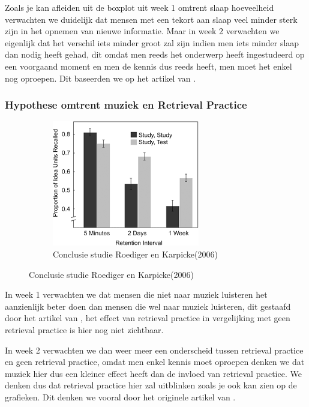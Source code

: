 \documentclass{hogent-article}
\begin{document}
Zoals je kan afleiden uit de boxplot uit week 1 omtrent slaap hoeveelheid verwachten we duidelijk dat mensen met een tekort aan slaap veel minder sterk zijn in het opnemen van nieuwe informatie. Maar in week 2 verwachten we eigenlijk dat het verschil iets minder groot zal zijn indien men iets minder slaap dan nodig heeft gehad, dit omdat men reeds het onderwerp heeft ingestudeerd op een voorgaand moment en men de kennis dus reeds heeft, men moet het enkel nog oproepen. Dit baseerden we op het artikel van \textcite{Potkin2012}.


\subsubsection{Hypothese omtrent muziek en Retrieval Practice}
\begin{figure}[H]
	\begin{subfigure}{0.45\textwidth}
		\includegraphics[width=0.8\linewidth]{hypotheseGraph2}
		\caption{Conclusie studie Roediger en Karpicke(2006)}
	\end{subfigure}
\end{figure}

In week 1 verwachten we dat mensen die niet naar muziek luisteren het aanzienlijk beter doen dan mensen die wel naar muziek luisteren, dit gestaafd door het artikel van \textcite{Dolegui2013}, het effect van retrieval practice in vergelijking met geen retrieval practice is hier nog niet zichtbaar.\\
\par
\noindent
In week 2 verwachten we dan weer meer een onderscheid tussen retrieval practice en geen retrieval practice, omdat men enkel kennis moet oproepen denken we dat muziek hier dus een kleiner effect heeft dan de invloed van retrieval practice. We denken dus dat retrieval practice hier zal uitblinken zoals je ook kan zien op de grafieken. Dit denken we vooral door het originele artikel van \textcite{Roediger2006}.
\end{document}
